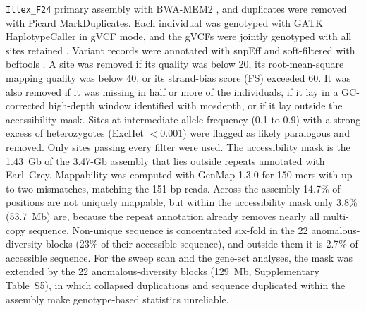 \documentclass[11pt]{article}
\begin{document}
\texttt{Illex\_F24} primary assembly with BWA-MEM2 \citep{vasimuddin2019bwamem2}, and duplicates were removed with
Picard MarkDuplicates. Each individual was genotyped with GATK HaplotypeCaller in gVCF mode, and the gVCFs were
jointly genotyped with all sites retained \citep{poplin2018gatk}. Variant records were annotated with snpEff and
soft-filtered with bcftools \citep{danecek2021samtools}. A site was removed if its quality was below 20, its
root-mean-square mapping quality was below 40, or its strand-bias score (FS) exceeded 60. It was also removed if
it was missing in half or more of the individuals, if it lay in a GC-corrected high-depth window identified with
mosdepth, or if it lay outside the accessibility mask. Sites at intermediate allele frequency (0.1 to 0.9) with a
strong excess of heterozygotes (ExcHet $<0.001$) were flagged as likely paralogous and removed. Only sites passing
every filter were used. The accessibility mask is the 1.43~Gb of the 3.47-Gb assembly that lies outside repeats annotated with Earl~Grey. Mappability was computed with GenMap 1.3.0 \citep{pockrandt2020genmap} for 150-mers with up to two mismatches, matching the 151-bp reads. Across the assembly 14.7\% of positions are not uniquely mappable, but within the accessibility mask only 3.8\% (53.7~Mb) are, because the repeat annotation already removes nearly all multi-copy sequence. Non-unique sequence is concentrated six-fold in the 22 anomalous-diversity blocks (23\% of their accessible sequence), and outside them it is 2.7\% of accessible sequence. For the sweep scan and the gene-set analyses, the mask was extended by the 22 anomalous-diversity blocks (129~Mb, Supplementary Table~S5), in which collapsed duplications and sequence duplicated within the assembly make genotype-based statistics unreliable.
\end{document}
